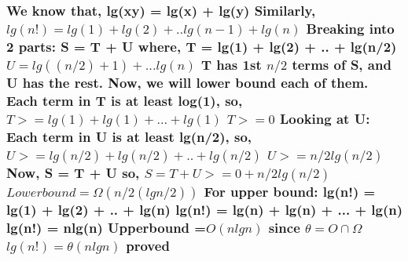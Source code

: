 \documentclass[a4paper,12pt]{article}
\begin{document}
\subsubsection*{\textnormal{We know that, lg(xy) = lg(x) + lg(y)\newline\newline
Similarly, $ lg(n!) = lg(1) + lg(2) +..   lg(n-1) + lg(n) $ \newline
\newline 
Breaking into 2 parts: S = T + U\newline
where, T = lg(1) + lg(2) + .. + lg(n/2)\newline
$U = lg((n/2)+1) + ...lg(n)$ \newline
T has 1st $ n/2$ terms of S, and U has the rest.\newline\newline
Now, we will lower bound each of them. \newline\newline
Each term in T is at least log(1),\newline
so, $ T >= lg(1) + lg(1) + ...+ lg(1)$\newline
$T >= 0$\newline \newline
Looking at U:\newline
Each term in U is at least lg(n/2), so, \newline
$U >=  lg(n/2) + lg(n/2) + .. + lg(n/2)$\newline
$U >= n/2lg(n/2)$ \newline \newline
Now, S = T + U so, \newline
$ S = T + U >= 0 + n/2lg(n/2)$\newline
$Lower bound = \Omega(n/2(lgn/2)) $\newline \newline \newpage
For upper bound:\newline 
lg(n!) = lg(1) + lg(2) + .. + lg(n)\newline
lg(n!) = lg(n) + lg(n) + ... + lg(n)\newline
lg(n!) = nlg(n)\newline
Upperbound =$ O(nlgn)$\newline \newline
since $ \theta = O \cap \Omega $ \newline
$lg(n!) = \theta (nlgn)$ proved \newline }}
\end{document}
